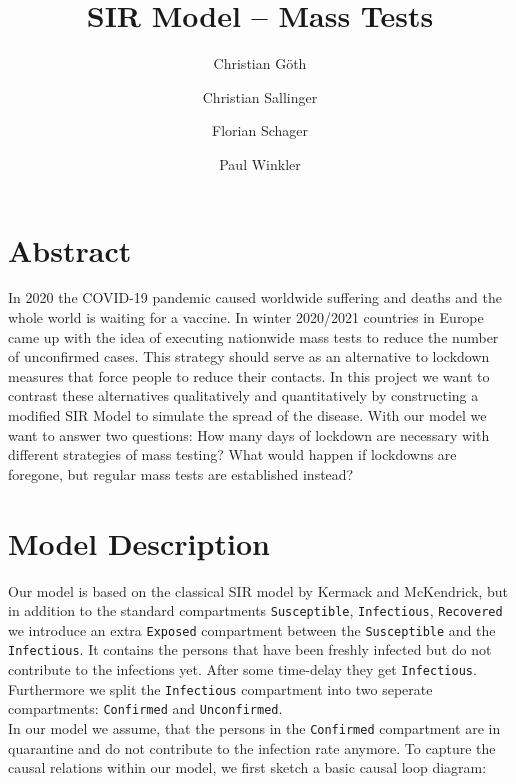 \documentclass
[
    report,
    11pt,
    bibliography = totoc,
    listof = totoc,
    headinclude = true,
]
{scrreport}
\begin{document}
\subject{Modeling \& Simulation}
\title{SIR Model -- Mass Tests}

\publishers{Supervisor : Martin Bicher}


\author{
Christian Göth \and
Christian Sallinger \and
Florian Schager \and
Paul Winkler
}


\maketitle

\chapter*{Abstract}

In 2020 the COVID-19 pandemic caused worldwide suffering and deaths and the
whole world is waiting for a vaccine. In winter 2020/2021 countries in Europe
came up with the idea of executing nationwide mass tests to reduce the number
of unconfirmed cases. This strategy should serve as an alternative to
lockdown measures that force people to reduce their contacts.
In this project we want to contrast these alternatives qualitatively and quantitatively
by constructing a modified SIR Model to simulate the spread of the disease.
With our model we want to answer two questions:
How many days of lockdown are necessary with different strategies of mass testing?
What would happen if lockdowns are foregone, but regular mass tests are established instead?

\tableofcontents


\chapter{Model Description}

Our model is based on the classical SIR model by Kermack and McKendrick,
but in addition to the standard compartments \texttt{Susceptible}, \texttt{Infectious}, \texttt{Recovered} we introduce an extra \texttt{Exposed} compartment between the \texttt{Susceptible} and the \texttt{Infectious}. It contains the persons that have been freshly infected but do not contribute to the infections yet. After some time-delay they get \texttt{Infectious}.
Furthermore we split the \texttt{Infectious} compartment into two seperate compartments:
\texttt{Confirmed} and \texttt{Unconfirmed}. \\
In our model we assume, that the persons in the \texttt{Confirmed} compartment are in
quarantine and do not contribute to the infection rate anymore.
To capture the causal relations within our model, we first sketch a basic
causal loop diagram:
\end{document}
